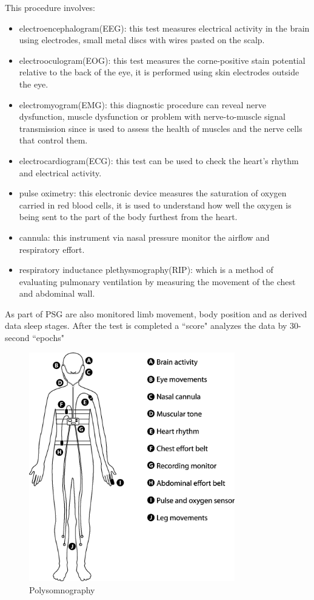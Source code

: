 This procedure involves:
\begin{itemize}
    \item electroencephalogram(EEG)\cite{ElectroencephalogramMedicine}: this test measures electrical activity in the brain using electrodes, small metal discs with wires pasted on the scalp.
    \item electrooculogram(EOG)\cite{CREEL2019495}: this test measures the corne-positive stain potential relative to the back of the eye, it is performed using skin electrodes outside the eye.
    \item electromyogram(EMG)\cite{ElectromyographySite}: this diagnostic procedure can reveal nerve dysfunction, muscle dysfunction or problem with nerve-to-muscle signal transmission since is used to assess the health of muscles and the nerve cells that control them.
    \item electrocardiogram(ECG)\cite{ElectrocardiogramNHS}: this test can be used to check the heart's rhythm and electrical activity.
    \item pulse oximetry\cite{PulseMedicine}: this electronic device measures the saturation of oxygen carried in red blood cells, it is used to understand how well the oxygen is being sent to the part of the body furthest from the heart.
    \item cannula: this instrument via nasal pressure monitor the airflow and respiratory effort\cite{heitman2002validation}.
    \item respiratory inductance plethysmography(RIP)\cite{Brullmann2010RespiratoryCalibration}: which is a method of evaluating pulmonary ventilation by measuring the movement of the chest and abdominal wall.
\end{itemize}
As part of PSG are also monitored limb movement, body position and as derived data sleep stages. 
After the test is completed a ``score" analyzes the data by 30-second ``epochs"

\begin{figure}[H]
    \centering
    \includegraphics[width=0.8\textwidth]{img/PSG test.png}
    \caption{Polysomnography}
    \label{fig:PSGComplete}
\end{figure}

